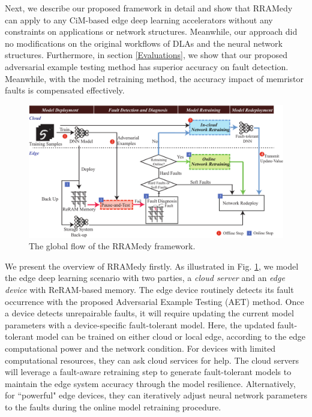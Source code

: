 Next, we describe our proposed framework in detail and show that RRAMedy can apply to any CiM-based edge deep learning accelerators without any constraints on applications or network structures. Meanwhile, our approach did no  modifications on the original workflows of DLAs and the neural network structures. Furthermore, in section \ref{Evaluations}, we show that our proposed adversarial example testing method has superior accuracy on fault detection. Meanwhile, with the model retraining method, the accuracy impact of memristor faults is compensated effectively.  


\begin{figure}
    \centering
    \includegraphics[width=0.8\linewidth]{images/OL-fig3}
    \caption{The global flow of the RRAMedy framework.}
    \label{fig:overview}
    \vspace {-15pt}
\end{figure}

We present the overview of RRAMedy firstly. As illustrated in Fig. \ref{fig:overview}, we model the edge deep learning scenario with two parties, a \emph{cloud server}  and an \emph{edge device} with ReRAM-based memory. The edge device routinely detects its fault occurrence with the proposed Adversarial Example Testing (AET) method. Once a device detects unrepairable faults, it will require updating the current model parameters with a device-specific fault-tolerant model. Here, the updated fault-tolerant model can be trained on either cloud or local edge, according to the edge computational power and the network condition. For devices with limited computational resources, they can ask cloud services for help. The cloud servers will leverage a fault-aware retraining step to generate  fault-tolerant models to maintain the edge system accuracy through the model resilience. Alternatively, for ``powerful" edge devices, they can iteratively adjust neural network parameters to the faults during the online model retraining procedure. 
                                                                            
